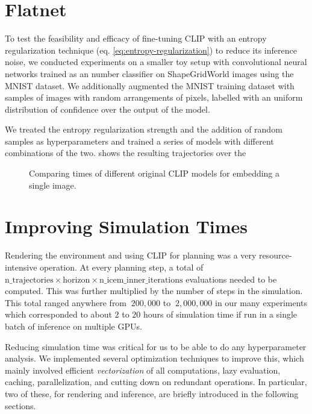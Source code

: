 \chapter{Flatnet}
\label{sec:flatnet}
To test the feasibility and efficacy of fine-tuning CLIP with an entropy regularization technique (eq. \ref{eq:entropy-regularization}) to reduce its inference noise, we conducted experiments on a smaller toy setup with convolutional neural networks trained as an number classifier on ShapeGridWorld images using the MNIST dataset.
We additionally augmented the MNIST training dataset with samples of images with random arrangements of pixels, labelled with an uniform distribution of confidence over the output of the model.

We treated the entropy regularization strength and the addition of random samples as hyperparameters and trained a series of models with different combinations of the two.
 shows the resulting trajectories over the 

\begin{figure}[h]
    \centering
    \caption{Comparing times of different original CLIP models for embedding a single image.}
    \label{fig:flatnet-comparison}
\end{figure}



\chapter{Improving Simulation Times}
\label{sec:efficiency}
Rendering the environment and using CLIP for planning was a very resource-intensive operation.
At every planning step, a total of \(\text{n\_trajectories} \times \text{horizon} \times \text{n\_icem\_inner\_iterations}\) evaluations needed to be computed.
This was further multiplied by the number of steps in the simulation.
This total ranged anywhere from \(~200,000\) to \(~2,000,000\) in our many experiments which corresponded to about \(2\) to \(20\) hours of simulation time if run in a single batch of inference on multiple GPUs.

Reducing simulation time was critical for us to be able to do any hyperparameter analysis.
We implemented several optimization techniques to improve this, which mainly involved efficient \emph{vectorization} of all computations, lazy evaluation, caching, parallelization, and cutting down on redundant operations.
In particular, two of these, for rendering and inference, are briefly introduced in the following sections.

